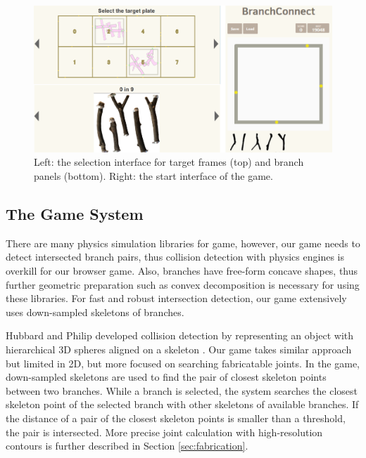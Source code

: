 \begin{figure}[ht]
  \begin{center}
    \includegraphics[width = 0.4\paperwidth]{images/interface/game_interface.png}
    \caption{Left: the selection interface for target frames (top) and branch panels (bottom). Right: the start interface of the game.}
    \label{fig:game_interface}
  \end{center}
\end{figure}
%
\subsection{The Game System}
There are many physics simulation libraries for game, however, our game needs to detect intersected branch pairs, thus collision detection with physics engines is overkill for our browser game.
Also, branches have free-form concave shapes, thus further geometric preparation such as convex decomposition is necessary for using these libraries.
For fast and robust intersection detection, our game extensively uses down-sampled skeletons of branches.

Hubbard and Philip developed collision detection by representing an object with hierarchical 3D spheres aligned on a skeleton \cite{Hubbard:1996:APS:231731.231732}.
Our game takes similar approach but limited in 2D, but more focused on searching fabricatable joints.
In the game, down-sampled skeletons are used to find the pair of closest skeleton points between two branches.
While a branch is selected, the system searches the closest skeleton point of the selected branch with other skeletons of available branches.
If the distance of a pair of the closest skeleton points is smaller than a threshold, the pair is intersected.
More precise joint calculation with high-resolution contours is further described in Section \ref{sec:fabrication}.


